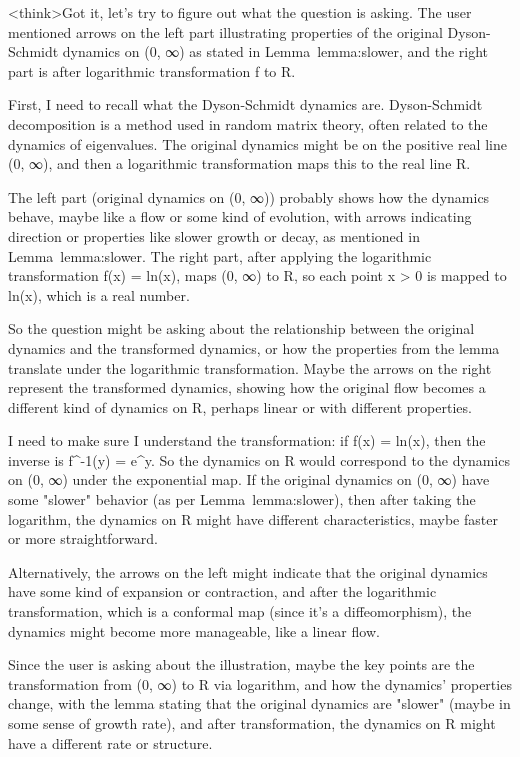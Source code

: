 <think>Got it, let's try to figure out what the question is asking. The user mentioned arrows on the left part illustrating properties of the original Dyson-Schmidt dynamics on (0, ∞) as stated in Lemma~lemma:slower, and the right part is after logarithmic transformation f to R. 

First, I need to recall what the Dyson-Schmidt dynamics are. Dyson-Schmidt decomposition is a method used in random matrix theory, often related to the dynamics of eigenvalues. The original dynamics might be on the positive real line (0, ∞), and then a logarithmic transformation maps this to the real line R. 

The left part (original dynamics on (0, ∞)) probably shows how the dynamics behave, maybe like a flow or some kind of evolution, with arrows indicating direction or properties like slower growth or decay, as mentioned in Lemma~lemma:slower. The right part, after applying the logarithmic transformation f(x) = ln(x), maps (0, ∞) to R, so each point x > 0 is mapped to ln(x), which is a real number. 

So the question might be asking about the relationship between the original dynamics and the transformed dynamics, or how the properties from the lemma translate under the logarithmic transformation. Maybe the arrows on the right represent the transformed dynamics, showing how the original flow becomes a different kind of dynamics on R, perhaps linear or with different properties. 

I need to make sure I understand the transformation: if f(x) = ln(x), then the inverse is f^{-1}(y) = e^y. So the dynamics on R would correspond to the dynamics on (0, ∞) under the exponential map. If the original dynamics on (0, ∞) have some "slower" behavior (as per Lemma~lemma:slower), then after taking the logarithm, the dynamics on R might have different characteristics, maybe faster or more straightforward. 

Alternatively, the arrows on the left might indicate that the original dynamics have some kind of expansion or contraction, and after the logarithmic transformation, which is a conformal map (since it's a diffeomorphism), the dynamics might become more manageable, like a linear flow. 

Since the user is asking about the illustration, maybe the key points are the transformation from (0, ∞) to R via logarithm, and how the dynamics' properties change, with the lemma stating that the original dynamics are "slower" (maybe in some sense of growth rate), and after transformation, the dynamics on R might have a different rate or structure. 

